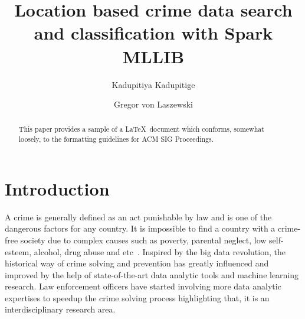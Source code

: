 
\title{Location based crime data search and classification with Spark MLLIB}


\author{Kadupitiya Kadupitige}

\author{Gregor von Laszewski}


\renewcommand{\shortauthors}{G. v. Laszewski}


\begin{abstract}
This paper provides a sample of a \LaTeX\ document which conforms,
somewhat loosely, to the formatting guidelines for
ACM SIG Proceedings.
\end{abstract}



\maketitle


\section{Introduction}

A crime is generally defined as an act punishable by law and is one of the 
dangerous factors for any country\cite{hid-sp18-409-agarwal2013crime}. It is 
impossible to find a country with a 
crime- free society due to complex causes such as poverty, parental neglect, 
low self-esteem, alcohol, drug abuse and 
etc~\cite{hid-sp18-409-bharathi2014survey, hid-sp18-409-kiani2015analysis}. 
Inspired by the big data revolution, the historical way of crime solving and 
prevention has greatly influenced and improved by the help of state-of-the-art 
data analytic tools and machine learning research. Law enforcement officers 
have started involving more data analytic expertises to speedup the crime 
solving process highlighting that, it is an interdisciplinary research area.

